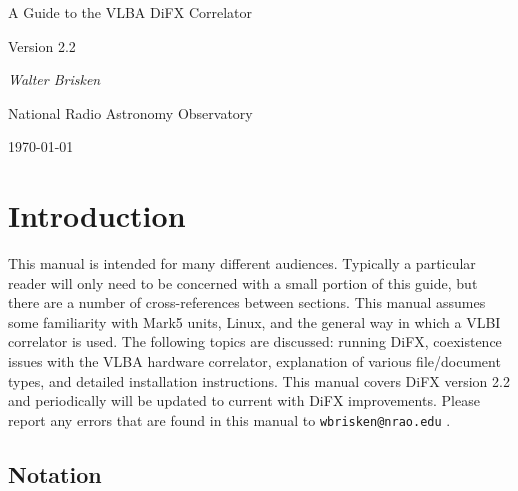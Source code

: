 \documentclass{article}
\begin{document}
\newcommand{\Oa}[1]{\hspace{-12pt}\makebox[12pt]{$\star$}#1}
\newcommand{\Da}[1]{\hspace{-12pt}\makebox[12pt]{$\times$}#1}
\newcommand{\bfit}[1]{{\textrm{\textit{\textmd{#1}}}}}


\begin{center}


{\LARGE A Guide to the VLBA DiFX Correlator}

\vspace{5pt}

{\Large Version 2.2}


\vspace{10pt}

{\it Walter Brisken}

\vspace{5pt}

National Radio Astronomy Observatory

\vspace{5pt}
\today

\end{center}

\tableofcontents

\section{Introduction}

This manual is intended for many different audiences.
Typically a particular reader will only need to be concerned with a small portion of this guide, but there are a number of cross-references between sections.
This manual assumes some familiarity with Mark5 units, Linux, and the general way in which a VLBI correlator is used.
The following topics are discussed: running DiFX, coexistence issues with the VLBA hardware correlator, explanation of various file/document types, and detailed installation instructions.
This manual covers DiFX version 2.2 and periodically will be updated to current with DiFX improvements.
Please report any errors that are found in this manual to {\tt wbrisken@nrao.edu} .

\subsection{Notation}
\end{document}
